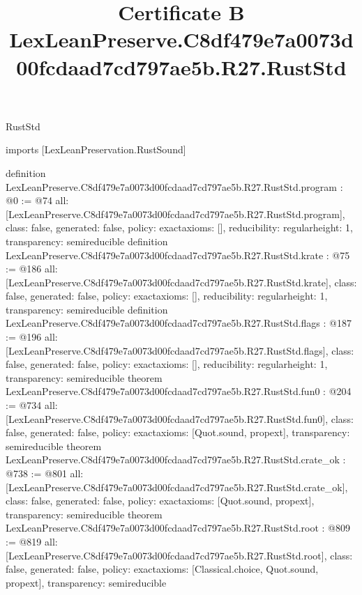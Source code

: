 \begin{lexlean}{RustStd}
\title{Certificate B LexLeanPreserve.C8df479e7a0073d00fcdaad7cd797ae5b.R27.RustStd}
\begin{coremodule}
imports [LexLeanPreservation.RustSound]

definition LexLeanPreserve.C8df479e7a0073d00fcdaad7cd797ae5b.R27.RustStd.program : @0 := @74 {
  all: [LexLeanPreserve.C8df479e7a0073d00fcdaad7cd797ae5b.R27.RustStd.program],
  class: false,
  generated: false,
  policy: exact{axioms: []},
  reducibility: regular{height: 1},
  transparency: semireducible
}
definition LexLeanPreserve.C8df479e7a0073d00fcdaad7cd797ae5b.R27.RustStd.krate : @75 := @186 {
  all: [LexLeanPreserve.C8df479e7a0073d00fcdaad7cd797ae5b.R27.RustStd.krate],
  class: false,
  generated: false,
  policy: exact{axioms: []},
  reducibility: regular{height: 1},
  transparency: semireducible
}
definition LexLeanPreserve.C8df479e7a0073d00fcdaad7cd797ae5b.R27.RustStd.flags : @187 := @196 {
  all: [LexLeanPreserve.C8df479e7a0073d00fcdaad7cd797ae5b.R27.RustStd.flags],
  class: false,
  generated: false,
  policy: exact{axioms: []},
  reducibility: regular{height: 1},
  transparency: semireducible
}
theorem LexLeanPreserve.C8df479e7a0073d00fcdaad7cd797ae5b.R27.RustStd.fun0 : @204 := @734 {
  all: [LexLeanPreserve.C8df479e7a0073d00fcdaad7cd797ae5b.R27.RustStd.fun0],
  class: false,
  generated: false,
  policy: exact{axioms: [Quot.sound, propext]},
  transparency: semireducible
}
theorem LexLeanPreserve.C8df479e7a0073d00fcdaad7cd797ae5b.R27.RustStd.crate_ok : @738 := @801 {
  all: [LexLeanPreserve.C8df479e7a0073d00fcdaad7cd797ae5b.R27.RustStd.crate_ok],
  class: false,
  generated: false,
  policy: exact{axioms: [Quot.sound, propext]},
  transparency: semireducible
}
theorem LexLeanPreserve.C8df479e7a0073d00fcdaad7cd797ae5b.R27.RustStd.root : @809 := @819 {
  all: [LexLeanPreserve.C8df479e7a0073d00fcdaad7cd797ae5b.R27.RustStd.root],
  class: false,
  generated: false,
  policy: exact{axioms: [Classical.choice, Quot.sound, propext]},
  transparency: semireducible
}


\end{coremodule}
\end{lexlean}
